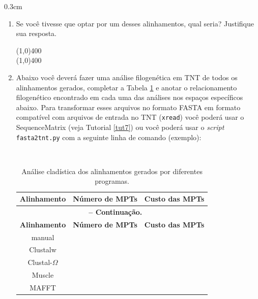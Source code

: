 \begin{refsection}
\begin {myindentpar}{0.3cm}
\begin{enumerate}[\itshape i.]
\item{Se você tivesse que optar por um desses alinhamentos, qual seria? Justifique sua resposta.}

\line(1,0){400}\\
\line(1,0){400}\\

\item{Abaixo você deverá fazer uma análise filogenética em TNT de todos os alinhamentos gerados, completar a Tabela \ref{tut8:table:align} e anotar o relacionamento filogenético encontrado em cada uma das análises nos espaços específicos abaixo. Para transformar esses arquivos no formato FASTA em formato compatível com arquivos de entrada no TNT (\texttt{xread}) você poderá usar o SequenceMatrix (veja Tutorial \ref{tut7}) ou você poderá usar o \textit{script} \texttt{fasta2tnt.py} com a seguinte linha de comando (exemplo): 

\scriptsize
{}\\
\normalsize
}


\pagestyle{fancy}
\begin{center}

\begin{longtable}{|c|c|c|}
\caption[Análise cladística de vários alinhamentos]{Análise cladística dos alinhamentos gerados por diferentes programas.} \label{tut8:table:align} \\


\hline\hline \textbf{Alinhamento} & \textbf{Número de MPTs}  & \textbf{Custo das MPTs}\\
\endfirsthead

\multicolumn{3}{c}{{\bfseries \tablename\ \thetable{} -- Continuação.}}\\
\hline\hline \textbf{Alinhamento} & \textbf{Número de MPTs} & \textbf{Custo das MPTs}\\
\endhead
\hline \hline
\endlastfoot

\hline manual &  & \\
\hline Clustalw &  & \\
\hline Clustal-$\Omega$ &  & \\
\hline Muscle &  & \\
\hline MAFFT &  & \\


\end{longtable}
\end{center}
\end{enumerate}
\end{myindentpar}
\end{refsection}
